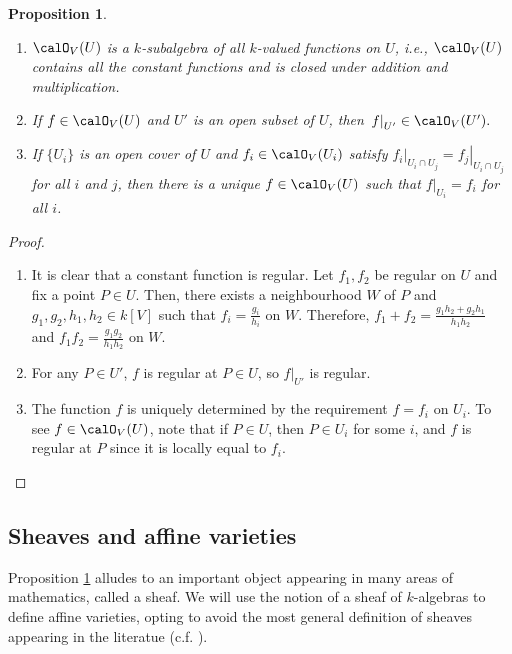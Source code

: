 \documentclass[12pt]{amsart}
\theoremstyle{plain}
\newtheorem{proposition}[theorem]{Proposition}
\begin{document}
\begin{proposition}\label{sheafprop}
\begin{enumerate}
\item
$\calO_V(U)$ is a $k$-subalgebra of all $k$-valued functions on $U$, i.e., $\calO_V(U)$ contains all the constant functions and is closed under addition and multiplication.

\item
If $f \in \calO_V(U)$ and $U'$ is an open subset of $U$, then $\left. f \right|_{U'} \in \calO_V(U').$

\item
If $\{U_i\}$ is an open cover of $U$ and $f_i \in \calO_V(U_i)$ satisfy $\left. f_i \right|_{U_i \cap U_j} = \left. f_j \right|_{U_i \cap U_j}$ for all $i$ and $j$, then there is a unique $f \in \calO_V(U)$ such that $\left. f \right|_{U_i} = f_i$ for all $i$.
\end{enumerate}
\end{proposition}
\begin{proof}
\begin{enumerate}
\item
It is clear that a constant function is regular.
Let $f_1, f_2$ be regular on $U$ and fix a point $P \in U$.
Then, there exists a neighbourhood $W$ of $P$ and $g_1, g_2, h_1, h_2 \in k[V]$ such that $f_i = \frac{g_i}{h_i}$ on $W$.
Therefore, $f_1 + f_2 = \frac{g_1 h_2 + g_2 h_1}{h_1 h_2}$ and $f_1 f_2 = \frac{g_1 g_2}{h_1 h_2}$ on $W$.

\item
For any $P \in U'$, $f$ is regular at $P \in U$, so $\left. f \right|_{U'}$ is regular.

\item
The function $f$ is uniquely determined by the requirement $f = f_i$ on $U_i$.
To see $f \in \calO_V(U)$, note that if $P \in U$, then $P\in U_i$ for some $i$, and $f$ is regular at $P$ since it is locally equal to $f_i$.
\end{enumerate}
\end{proof}

\subsection{Sheaves and affine varieties}\label{varietiessection}
Proposition \ref{sheafprop} alludes to an important object appearing in many areas of mathematics, called a sheaf.
We will use the notion of a sheaf of $k$-algebras to define affine varieties, opting to avoid the most general definition of sheaves appearing in the literatue (c.f. {\cite[Chapter II, \S 1]{Hartshorne77}}).
\end{document}
